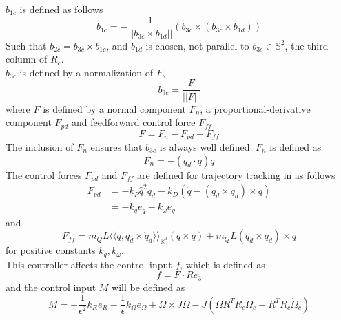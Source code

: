  $ b_{1c} $ is defined as follows
\begin{equation}\label{key}
b_{1c}=-\frac{1}{||b_{3c}\times b_{1d}||}(b_{3c}\times(b_{3c}\times b_{1d}))
\end{equation}
Such that $ b_{2c}= b_{3c}\times b_{1c}$, and $ b_{1d} $ is chosen, not parallel to $ b_{3c} \in \mathbb{S}^2 $, the third column of $ R_c $.\\
 $ b_{3c} $ is defined by a normalization of $ F $,
\begin{equation}\label{eq:con.b3c}
b_{3c}=\frac{F}{||F||}
\end{equation}
where $F $ is defined by a normal component $ F_n $, a proportional-derivative component $ F_{pd} $ and feedforward control force $ F_{ff}$
\begin{equation}\label{eq:con.F}
F=F_n-F_{pd}-F_{ff}
\end{equation}
The inclusion of $ F_n $ ensures that $ b_{3c} $ is always well defined. $ F_n $ is defined as
\begin{equation}\label{eq:con.Fn}
F_n=-(q_d\cdot q)q
\end{equation}
The control forces $ F_{pd} $ and $ F_{ff} $ are defined for trajectory tracking in \cite[11.2.5]{Bullo2005} as follows
\begin{equation}\label{eq:con.Fpd}
\begin{aligned}
F_{pd}&=-k_P\hat{q}^2q_d-k_D(\dot{q}-(q_d\times\dot{q}_d)\times q)\\
&=-k_qe_q-k_\omega e_{\dot{q}}
\end{aligned}
\end{equation}
and
\begin{equation}\label{key}
F_{ff}=m_QL\langle\!\langle q,q_d\times\dot{q}_d\rangle\!\rangle_{\mathbb{R}^3}(q\times \dot{q})+m_QL(q_d\times \ddot{q}_d)\times q
\end{equation}
for positive constants $ k_q, k_\omega $.\\	
This controller affects the control input $ f $, which is defined as
\begin{equation}\label{eq:con.floadatt}
f=F\cdot Re_3
\end{equation}
and the control input $ M $ will be defined as
\begin{equation}\label{eq:con.Mloadatt}
M = -\frac{1}{\epsilon^2}k_Re_R-\frac{1}{\epsilon}k_\Omega e_\Omega+\Omega\times J\Omega-J(\hat{\Omega}R^TR_c\Omega_c-R^TR_c\dot{\Omega}_c)
\end{equation} 

